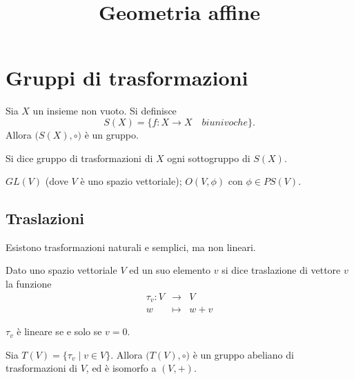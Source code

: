 \documentclass[a4paper,12pt]{article}
\title{\bf Geometria affine}
\date{}
\author{}
\newcommand{\Got}[1]{#1}
\newcommand{\got}[1]{{#1}}
\begin{document}
 \maketitle
 
 \section{Gruppi di trasformazioni}
 
 \Got{Sia} $\got{X}$ \Got{un  insieme non vuoto. Si definisce} $$\got{S(X)=\{f:X\to X\quad biunivoche\}}.$$ 
 \Got{Allora} $\got{(S(X),}\circ\got)$ \Got{è un gruppo.}
 
 \begin{definition}
 \Got{Si dice gruppo di trasformazioni di} $\got{X}$ \Got{ogni sottogruppo di} $\got{S(X).}$
 \end{definition}
 
 \begin{esempio}
 \Got{}$\got{GL(V)}$ \Got{(dove} $\got{V}$ \Got{è uno spazio vettoriale);} $\got{O(V,\phi)}$ \Got{con} $\got{\phi\in PS(V).}$
 \end{esempio}
 
 \subsection{Traslazioni}
 
 \Got{Esistono trasformazioni naturali e semplici, ma non lineari.}
 
 \begin{definition}
  \Got{Dato uno spazio vettoriale} $\got{V}$ \Got{ed un suo elemento} $\got{v}$ \Got{si dice traslazione di vettore} $\got{v}$ \Got{la funzione}
 \begin{eqnarray*}
	\got{\tau_v:V} & \to & \got{V} \\
	\got{w} & \mapsto & \got{w+v}
 \end{eqnarray*}
 \end{definition}
 
 \begin{remark}
  \Got{}$\got{\tau_v}$ \Got{è lineare se e solo se} $\got{v=0}$.
 \end{remark}
 
 \begin{proposition}
 \Got{Sia} $\got{T(V)=\{\tau_v\;|\;v\in V\}}$. \Got{Allora} $\got{(T(V),}\circ\got{)}$
 \Got{è un gruppo abeliano di trasformazioni di} $\got{V}$, \Got{ed è isomorfo a} $\got{(V,+)}$.
 \end{proposition}
 
\end{document}
